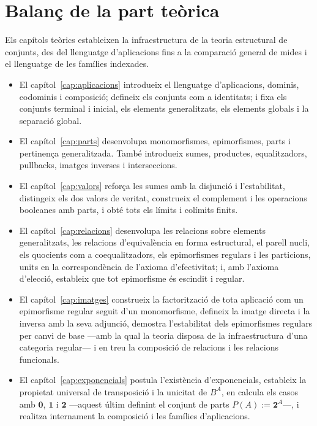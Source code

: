 \chapter*{Balanç de la part teòrica}
{}
\label{cap:balanc}

Els capítols teòrics estableixen la infraestructura de la teoria estructural de conjunts, des del llenguatge d'aplicacions fins a la comparació general de mides i el llenguatge de les famílies indexades.

\begin{itemize}
  \item El capítol~\ref{cap:aplicacions} introdueix el llenguatge d'aplicacions, dominis, codominis i composició; defineix els conjunts com a identitats; i fixa els conjunts terminal i inicial, els elements generalitzats, els elements globals i la separació global.
  \item El capítol~\ref{cap:parts} desenvolupa monomorfismes, epimorfismes, parts i pertinença generalitzada. També introdueix sumes, productes, equalitzadors, pullbacks, imatges inverses i interseccions.
  \item El capítol~\ref{cap:valors} reforça les sumes amb la disjunció i l'estabilitat, distingeix els dos valors de veritat, construeix el complement i les operacions booleanes amb parts, i obté tots els límits i colímits finits.
  \item El capítol~\ref{cap:relacions} desenvolupa les relacions sobre elements generalitzats, les relacions d'equivalència en forma estructural, el parell nucli, els quocients com a coequalitzadors, els epimorfismes regulars i les particions, units en la correspondència de l'axioma d'efectivitat; i, amb l'axioma d'elecció, estableix que tot epimorfisme és escindit i regular.
  \item El capítol~\ref{cap:imatges} construeix la factorització de tota aplicació com un epimorfisme regular seguit d'un monomorfisme, defineix la imatge directa i la inversa amb la seva adjunció, demostra l'estabilitat dels epimorfismes regulars per canvi de base ---amb la qual la teoria disposa de la infraestructura d'una categoria regular--- i en treu la composició de relacions i les relacions funcionals.
  \item El capítol~\ref{cap:exponencials} postula l'existència d'exponencials, estableix la propietat universal de transposició i la unicitat de $B^A$, en calcula els casos amb $\mathbf0$, $\mathbf1$ i $\mathbf2$ ---aquest últim definint el conjunt de parts $P(A):=\mathbf2^A$---, i realitza internament la composició i les famílies d'aplicacions.

\end{itemize}
